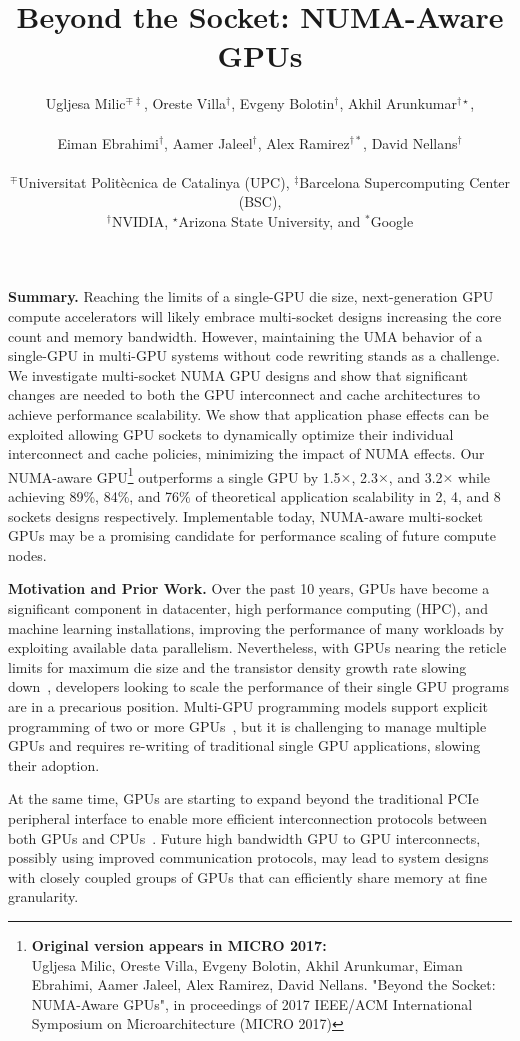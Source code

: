 \documentclass{sig-alternate}
\title{Beyond the Socket: NUMA-Aware GPUs}
\author{
Ugljesa Milic$^{\mp\ddagger}$,
Oreste Villa$^{\dagger}$,
Evgeny Bolotin$^{\dagger}$,
Akhil Arunkumar$^{\dagger\star}$,\\\\
Eiman Ebrahimi$^{\dagger}$,
Aamer Jaleel$^{\dagger}$,
Alex Ramirez$^{\dagger\ast}$,
David Nellans$^{\dagger}$
\\\\
$^{\mp}$Universitat Polit\`ecnica de Catalinya (UPC), $^{\ddagger}$Barcelona Supercomputing Center (BSC), \\
$^{\dagger}$NVIDIA, $^{\star}$Arizona State University, and $^{\ast}$Google\\
}
\begin{document}
\maketitle
\pagestyle{plain}

\textbf{Summary.} Reaching the limits of a single-GPU die size, next-generation GPU compute accelerators will likely embrace multi-socket designs increasing the core count and memory bandwidth. However, maintaining the UMA behavior of a single-GPU in multi-GPU systems without code rewriting stands as a challenge. We investigate multi-socket NUMA GPU designs and show that significant changes are needed to both the GPU interconnect and cache architectures to achieve performance scalability. We show that application phase effects can be exploited allowing GPU sockets to dynamically optimize their individual interconnect and cache policies, minimizing the impact of NUMA effects. Our NUMA-aware GPU\footnote{\textbf{Original version appears in MICRO 2017:} \\ Ugljesa Milic, Oreste Villa, Evgeny Bolotin, Akhil Arunkumar, Eiman Ebrahimi, Aamer Jaleel, Alex Ramirez, David Nellans. "Beyond the Socket: NUMA-Aware GPUs", in proceedings of 2017 IEEE/ACM International Symposium on Microarchitecture (MICRO 2017)} outperforms a single GPU by 1.5$\times$, 2.3$\times$, and 3.2$\times$ while achieving 89\%, 84\%, and 76\% of theoretical application scalability in 2, 4, and 8 sockets designs respectively. Implementable today, NUMA-aware multi-socket GPUs may be a promising candidate for performance scaling of future compute nodes.



\textbf{Motivation and Prior Work.} Over the past 10 years, GPUs have become a significant component in datacenter, high performance computing (HPC), and machine learning installations, improving the performance of many workloads by exploiting available data parallelism. Nevertheless, with GPUs nearing the reticle limits for maximum die size and the transistor density growth rate slowing down~\cite{mooredead2016}, developers 
looking to scale the performance of their single GPU programs are in a 
precarious position. Multi-GPU programming models support explicit programming 
of two or more GPUs~\cite{NVIDIAMPI}, but it is challenging to manage multiple GPUs and requires re-writing of traditional single GPU applications,
slowing their adoption.

At the same time, GPUs are starting to expand beyond the traditional PCIe peripheral interface to enable more efficient interconnection
protocols between both GPUs and CPUs~\cite{AMDINFINITYFABRIC,NVLINK}.
Future high bandwidth GPU to GPU interconnects, possibly using
improved communication protocols, may lead to system designs with closely coupled
groups of GPUs that can efficiently share memory at fine granularity.
\end{document}
